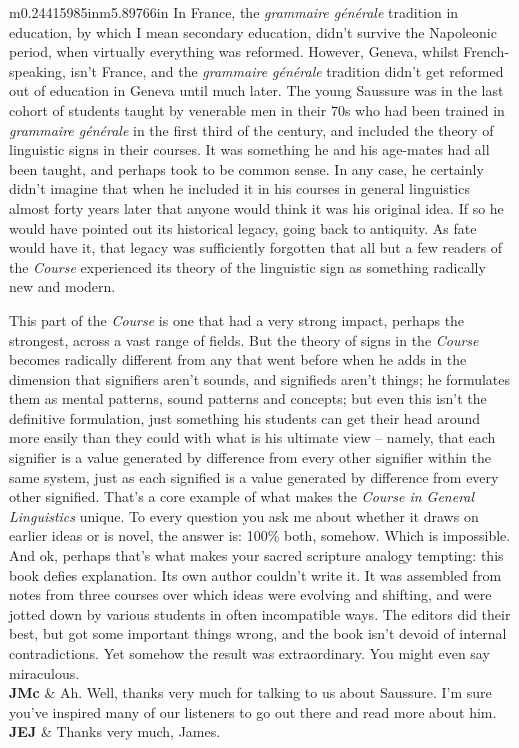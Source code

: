 \documentclass[12pt]{article}
\begin{document}
\begin{flushleft}
\begin{supertabular}{m{0.24415985in}m{5.89766in}}
In France, the \textit{grammaire générale} tradition in education, by which I mean secondary education, didn’t survive the Napoleonic period, when virtually everything was reformed. However, Geneva, whilst French-speaking, isn’t France, and the \textit{grammaire générale} tradition didn’t get reformed out of education in Geneva until much later. The young Saussure was in the last cohort of students taught by venerable men in their 70s who had been trained in \textit{grammaire générale} in the first third of the century, and included the theory of linguistic signs in their courses. It was something he and his age-mates had all been taught, and perhaps took to be common sense. In any case, he certainly didn’t imagine that when he included it in his courses in general linguistics almost forty years later that anyone would think it was his original idea. If so he would have pointed out its historical legacy, going back to antiquity. As fate would have it, that legacy was sufficiently forgotten that all but a few readers of the \textit{Course} experienced its theory of the linguistic sign as something radically new and modern.

This part of the \textit{Course} is one that had a very strong impact, perhaps the strongest, across a vast range of fields. But the theory of signs in the \textit{Course} becomes radically different from any that went before when he adds in the dimension that signifiers aren’t sounds, and signifieds aren’t things; he formulates them as mental patterns, sound patterns and concepts; but even this isn’t the definitive formulation, just something his students can get their head around more easily than they could with what is his ultimate view – namely, that each signifier is a value generated by difference from every other signifier within the same system, just as each signified is a value generated by difference from every other signified. That’s a core example of what makes the \textit{Course in General Linguistics} unique. To every question you ask me about whether it draws on earlier ideas or is novel, the answer is: 100\% both, somehow. Which is impossible. And ok, perhaps that’s what makes your sacred scripture analogy tempting: this book defies explanation. Its own author couldn’t write it. It was assembled from notes from three courses over which ideas were evolving and shifting, and were jotted down by various students in often incompatible ways. The editors did their best, but got some important things wrong, and the book isn’t devoid of internal contradictions. Yet somehow the result was extraordinary. You might even say miraculous.\\
\textbf{JMc}\newline
 &
Ah. Well, thanks very much for talking to us about Saussure. I’m sure you’ve inspired many of our listeners to go out there and read more about him.\\
\textbf{JEJ}\newline
 &
Thanks very much, James. \\
\end{supertabular}
\end{flushleft}
\end{document}
